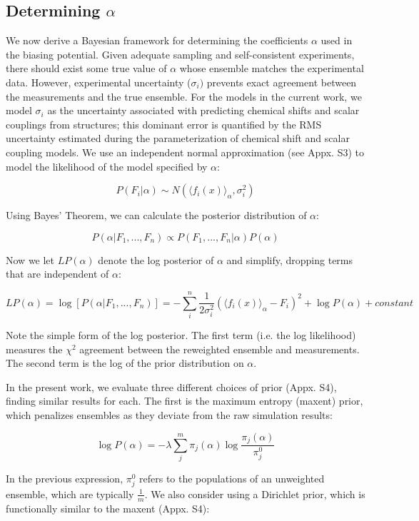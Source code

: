 \documentclass[11pt,titlepage]{article}
\begin{document}
\subsection*{Determining $\alpha$}

We now derive a Bayesian framework for determining the coefficients $\alpha$ used in the biasing potential.  Given adequate sampling and self-consistent experiments, there should exist some true value of $\alpha$ whose ensemble matches the experimental data.  However, experimental uncertainty ($\sigma_i)$ prevents exact agreement between the measurements and the true ensemble.  For the models in the current work, we model $\sigma_i$ as the uncertainty associated with predicting chemical shifts and scalar couplings from structures; this dominant error is quantified by the RMS uncertainty estimated during the parameterization of chemical shift and scalar coupling models.  We use an independent normal approximation (see Appx. S3) to model the likelihood of the model specified by $\alpha$:

$$P(F_i | \alpha) \sim N(\langle f_i(x)\rangle _\alpha, \sigma_i^2)$$

Using Bayes' Theorem, we can calculate the posterior distribution of $\alpha$:

$$P(\alpha | F_1, ..., F_n) \propto P(F_1, ..., F_n | \alpha) P(\alpha)$$

Now we let $LP(\alpha)$ denote the log posterior of $\alpha$ and simplify, dropping terms that are independent of $\alpha$:

$$LP(\alpha) = \log[ P(\alpha|F_1, ..., F_n)] = -\sum_i^n \frac{1}{2\sigma_i^2}(\langle f_i(x)\rangle _\alpha - F_i)^2 + \log P(\alpha) + constant$$

Note the simple form of the log posterior.  The first term (i.e. the log likelihood) measures the $\chi^2$ agreement between the reweighted ensemble and measurements.  The second term is the log of the prior distribution on $\alpha$.  

In the present work, we evaluate three different choices of prior (Appx. S4), finding similar results for each.  The first is the maximum entropy (maxent) prior, which penalizes ensembles as they deviate from the raw simulation results:

$$\log P(\alpha) = -\lambda \sum_j^m \pi_j(\alpha) \log \frac{\pi_j(\alpha)}{\pi_j^0}$$

In the previous expression, $\pi_j^0$ refers to the populations of an unweighted ensemble, which are typically $\frac{1}{m}$.  We also consider using a Dirichlet prior, which is functionally similar to the maxent (Appx. S4):
\end{document}
